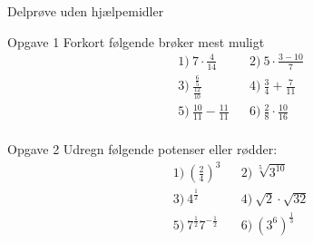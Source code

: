 \documentclass[12pt,x11names,a4paper]{article}
\begin{document}
\newpage

\begin{center}
\LARGE
Delprøve uden hjælpemidler
\end{center}
\begin{opgavetekst}{Opgave 1}
	Forkort følgende brøker mest muligt
	\begin{align*}
		&1) \ 7\cdot \frac{4}{14}  &&2)\ 5\cdot \frac{3-10}{7}   \\
		&3) \ \frac{\frac{6}{5}}{\frac{12}{10}}  &&4)\ \frac{3}{4}+\frac{7}{11}   \\
		&5) \ \frac{10}{11}-\frac{11}{11}  &&6)\ \frac{2}{8}\cdot \frac{10}{16}   \\
	\end{align*}
\end{opgavetekst}
\begin{opgavetekst}{Opgave 2}
	Udregn følgende potenser eller rødder:
	\begin{align*}
		&1) \ \left(\frac{2}{4}\right)^3  &&2) \  \sqrt[5]{3^{10}}  \\
		&3) \ 4^{\frac{1}{2}}  &&4) \ \sqrt{2}\cdot \sqrt{32}   \\
		&5) \ 7^{\frac{1}{2}}7^{-\frac{1}{2}}  &&6) \ \left(3^{6}\right)^\frac{1}{3}   \\
	\end{align*}
\end{opgavetekst}
\end{document}
